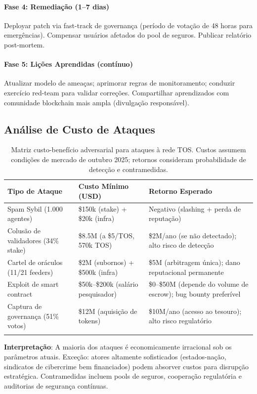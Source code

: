 \documentclass[11pt]{article}
\begin{document}
\begin{itemize}[noitemsep]
\begin{itemize}[noitemsep]
\begin{itemize}[noitemsep]
\paragraph{Fase 4: Remediação (1--7 dias)}
Deployar patch via fast-track de governança (período de votação de 48 horas para emergências). Compensar usuários afetados do pool de seguros. Publicar relatório post-mortem.

\paragraph{Fase 5: Lições Aprendidas (contínuo)}
Atualizar modelo de ameaças; aprimorar regras de monitoramento; conduzir exercício red-team para validar correções. Compartilhar aprendizados com comunidade blockchain mais ampla (divulgação responsável).

\subsection{Análise de Custo de Ataques}

\begin{longtable}{@{}p{}p{}p{}@{}}
\toprule
\textbf{Tipo de Ataque} & \textbf{Custo Mínimo (USD)} & \textbf{Retorno Esperado} \\\midrule
Spam Sybil (1.000 agentes) & \$150k (stake) + \$20k (infra) & Negativo (slashing + perda de reputação) \\
Colusão de validadores (34\% stake) & \$8.5M (a \$5/TOS, 570k TOS) & \$2M/ano (se não detectado); alto risco de detecção \\
Cartel de oráculos (11/21 feeders) & \$2M (subornos) + \$500k (infra) & \$5M (arbitragem única); dano reputacional permanente \\
Exploit de smart contract & \$50k--\$200k (salário pesquisador) & \$0--\$50M (depende do volume de escrow); bug bounty preferível \\
Captura de governança (51\% votos) & \$12M (aquisição de tokens) & \$10M/ano (acesso ao tesouro); alto risco regulatório \\
\bottomrule
\caption{Matriz custo-benefício adversarial para ataques à rede TOS. Custos assumem condições de mercado de outubro 2025; retornos consideram probabilidade de detecção e contramedidas.}
\end{longtable}

\textbf{Interpretação}: A maioria dos ataques é economicamente irracional sob os parâmetros atuais. Exceção: atores altamente sofisticados (estados-nação, sindicatos de cibercrime bem financiados) podem absorver custos para disrupção estratégica. Contramedidas incluem pools de seguros, cooperação regulatória e auditorias de segurança contínuas.


\end{itemize}
\end{itemize}
\end{itemize}
\end{document}
